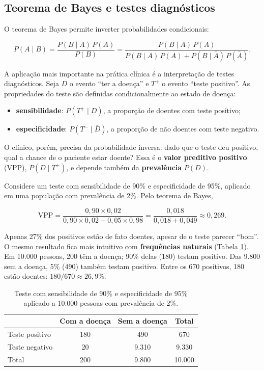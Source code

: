 \documentclass[
]{book}
\providecommand{\tightlist}{%
  \setlength{\itemsep}{0pt}\setlength{\parskip}{0pt}}
\begin{document}
\subsection{Teorema de Bayes e testes diagnósticos}\label{teorema-de-bayes-e-testes-diagnuxf3sticos}

O teorema de Bayes permite inverter probabilidades condicionais:

\[
P(A \mid B) = \frac{P(B \mid A)\,P(A)}{P(B)} = \frac{P(B \mid A)\,P(A)}{P(B \mid A)\,P(A) + P(B \mid \bar{A})\,P(\bar{A})}.
\]

A aplicação mais importante na prática clínica é a interpretação de testes diagnósticos. Seja \(D\) o evento ``ter a doença'' e \(T^+\) o evento ``teste positivo''. As propriedades do teste são definidas condicionalmente ao estado de doença:

\begin{itemize}
\tightlist
\item
  \textbf{sensibilidade}: \(P(T^+ \mid D)\), a proporção de doentes com teste positivo;
\item
  \textbf{especificidade}: \(P(T^- \mid \bar{D})\), a proporção de não doentes com teste negativo.
\end{itemize}

O clínico, porém, precisa da probabilidade inversa: dado que o teste deu positivo, qual a chance de o paciente estar doente? Essa é o \textbf{valor preditivo positivo} (VPP), \(P(D \mid T^+)\), e depende também da \textbf{prevalência} \(P(D)\).

Considere um teste com sensibilidade de 90\% e especificidade de 95\%, aplicado em uma população com prevalência de 2\%. Pelo teorema de Bayes,

\[
\text{VPP} = \frac{0{,}90 \times 0{,}02}{0{,}90 \times 0{,}02 + 0{,}05 \times 0{,}98} = \frac{0{,}018}{0{,}018 + 0{,}049} \approx 0{,}269.
\]

Apenas 27\% dos positivos estão de fato doentes, apesar de o teste parecer ``bom''. O mesmo resultado fica mais intuitivo com \textbf{frequências naturais} (Tabela \ref{tab:inf-bayes}). Em 10.000 pessoas, 200 têm a doença; 90\% delas (180) testam positivo. Das 9.800 sem a doença, 5\% (490) também testam positivo. Entre os 670 positivos, 180 estão doentes: \(180/670 \approx 26{,}9\%\).



\begin{table}

\caption{\label{tab:inf-bayes}Teste com sensibilidade de 90\% e especificidade de 95\% aplicado a 10.000 pessoas com prevalência de 2\%.}
\centering
\begin{tabular}[t]{l|c|c|c}
\hline
 & Com a doença & Sem a doença & Total\\
\hline
Teste positivo & 180 & 490 & 670\\
\hline
Teste negativo & 20 & 9.310 & 9.330\\
\hline
Total & 200 & 9.800 & 10.000\\
\hline
\end{tabular}
\end{table}
\end{document}
